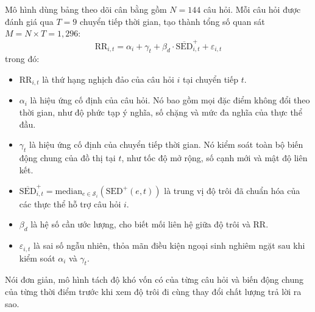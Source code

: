 Mô hình dùng bảng theo dõi cân bằng gồm $N = 144$ câu hỏi. Mỗi câu hỏi được đánh giá qua $T = 9$ chuyển tiếp thời gian, tạo thành tổng số quan sát $M = N \times T = 1,296$:
\begin{equation}
\text{RR}_{i,t} = \alpha_i + \gamma_t + \beta_d \cdot \overline{\text{SED}}^+_{i,t} + \varepsilon_{i,t}
\label{eq:twfe_specification}
\end{equation}
trong đó:
\begin{itemize}
    \item $\text{RR}_{i,t}$ là thứ hạng nghịch đảo của câu hỏi $i$ tại chuyển tiếp $t$.
    \item $\alpha_i$ là hiệu ứng cố định của câu hỏi. Nó bao gồm mọi đặc điểm không đổi theo thời gian, như độ phức tạp ý nghĩa, số chặng và mức đa nghĩa của thực thể đầu.
    \item $\gamma_t$ là hiệu ứng cố định của chuyển tiếp thời gian. Nó kiểm soát toàn bộ biến động chung của đồ thị tại $t$, như tốc độ mở rộng, số cạnh mới và mật độ liên kết.
    \item $\overline{\text{SED}}^+_{i,t} = \text{median}_{e \in \mathcal{S}_i}\left(\text{SED}^+(e, t)\right)$ là trung vị độ trôi đã chuẩn hóa của các thực thể hỗ trợ câu hỏi $i$.
    \item $\beta_d$ là hệ số cần ước lượng, cho biết mối liên hệ giữa độ trôi và RR.
    \item $\varepsilon_{i,t}$ là sai số ngẫu nhiên, thỏa mãn điều kiện ngoại sinh nghiêm ngặt sau khi kiểm soát $\alpha_i$ và $\gamma_t$.
\end{itemize}
Nói đơn giản, mô hình tách độ khó vốn có của từng câu hỏi và biến động chung của từng thời điểm trước khi xem độ trôi đi cùng thay đổi chất lượng trả lời ra sao.
